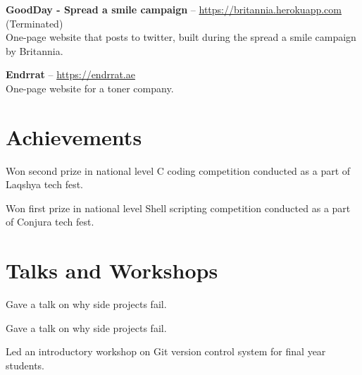 \documentclass[11pt,a4paper]{moderncv}
\begin{document}
\cvlistitem
{\textbf{GoodDay - Spread a smile campaign} -- {\small \href{https://britannia.herokuapp.com}{https://britannia.herokuapp.com}} (Terminated)
  \\One-page website that posts to twitter, built during the spread a smile campaign by Britannia.
}

\vspace{5pt}

\cvlistitem
{\textbf{Endrrat} -- {\small \href{https://endrrat.ae}{https://endrrat.ae}}
  \\One-page website for a toner company.
}




\vspace{10pt}
\section{Achievements}

{Won second prize in national level C coding competition conducted as a part of Laqshya tech fest.}

{Won first prize in national level Shell scripting competition conducted as a part of Conjura tech fest.}




\break
\section{Talks and Workshops}

{Gave a talk on why side projects fail.}

{Gave a talk on why side projects fail.}

{Led an introductory workshop on Git version control system for final year students.}


\end{document}
